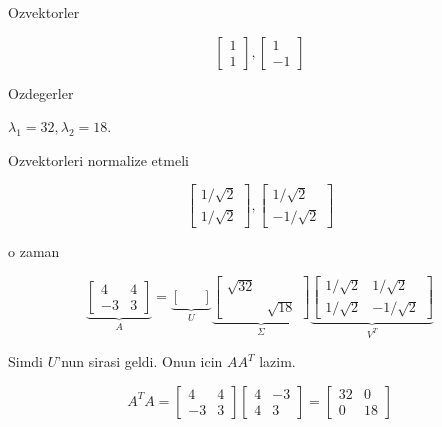 \documentclass[12pt,fleqn]{article}\usepackage{../common}
\begin{document}
Ozvektorler

\[ 
\left[\begin{array}{r}
1 \\ 1
\end{array}\right],
\left[\begin{array}{r}
1 \\ -1
\end{array}\right]
 \]

Ozdegerler

$\lambda_1=32, \lambda_2=18$. 

Ozvektorleri normalize etmeli

\[ 
\left[\begin{array}{r}
1 / \sqrt{ 2} \\ 1/ \sqrt{ 2}
\end{array}\right],
\left[\begin{array}{r}
1/ \sqrt{ 2} \\ -1/ \sqrt{ 2}
\end{array}\right]
 \]

o zaman 

\[ 
\underbrace{
\left[\begin{array}{rr}
4 & 4 \\ -3 & 3
\end{array}\right] 
}_{A}
=
\underbrace{
\left[\begin{array}{rr}
 &  \\  & 
\end{array}\right]
}_{U}
\underbrace{
\left[\begin{array}{rr}
\sqrt{ 32} &  \\  & \sqrt{ 18}
\end{array}\right]
}_{\Sigma}
\underbrace{
\left[\begin{array}{rr}
1/\sqrt{ 2} & 1/\sqrt{ 2} \\ 1/\sqrt{ 2} & -1/\sqrt{ 2}
\end{array}\right]
}_{V^T}
 \]

Simdi $U$'nun sirasi geldi. Onun icin $AA^T$ lazim. 

\[ A^TA = 
\left[\begin{array}{rr}
4 & 4 \\ -3 & 3
\end{array}\right] 
\left[\begin{array}{rr}
4 & -3 \\ 4 & 3
\end{array}\right] =
\left[\begin{array}{rr}
32 & 0 \\ 0 & 18
\end{array}\right]
 \]
\end{document}
